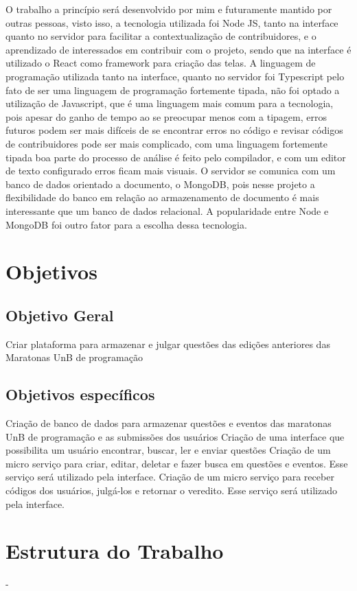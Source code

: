 O trabalho a princípio será desenvolvido por mim e futuramente mantido por outras pessoas, visto
isso, a tecnologia utilizada foi Node JS, tanto na interface quanto no servidor para facilitar a
contextualização de contribuidores, e o aprendizado de interessados em contribuir com o projeto,
sendo que na interface é utilizado o React como framework para criação das telas. A linguagem de
programação utilizada tanto na interface, quanto no servidor foi Typescript pelo fato de ser uma
linguagem de programação fortemente tipada, não foi optado a utilização de Javascript, que é uma
linguagem mais comum para a tecnologia, pois apesar do ganho de tempo ao se preocupar menos com a
tipagem, erros futuros podem ser mais difíceis de se encontrar erros no código e revisar códigos de
contribuidores pode ser mais complicado, com uma linguagem fortemente tipada boa parte do processo
de análise é feito pelo compilador, e com um editor de texto configurado erros ficam mais visuais.
O servidor se comunica com um banco de dados orientado a documento, o MongoDB, pois nesse projeto a
flexibilidade do banco em relação ao armazenamento de documento é mais interessante que um banco de
dados relacional. A popularidade entre Node e MongoDB foi outro fator para a escolha dessa
tecnologia.


\section{Objetivos}

\subsection{Objetivo Geral}

Criar plataforma para armazenar e julgar questões das edições anteriores das Maratonas UnB de
programação

\subsection{Objetivos específicos}

Criação de banco de dados para armazenar questões e eventos das maratonas UnB de programação e as
submissões dos usuários
Criação de uma interface que possibilita um usuário encontrar, buscar, ler e enviar questões
Criação de um micro serviço para criar, editar, deletar e fazer busca em questões e eventos. Esse
serviço será utilizado pela interface.
Criação  de um micro serviço para receber códigos dos usuários, julgá-los e retornar o veredito.
Esse serviço será utilizado pela interface.

\section{Estrutura do Trabalho}

-

